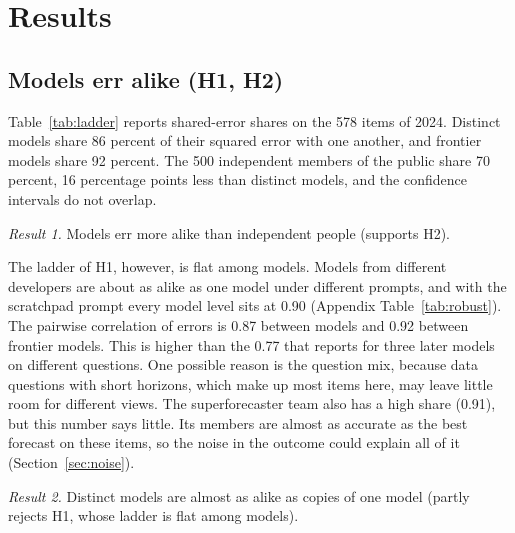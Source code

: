 \documentclass[11pt,a4paper]{article}
\theoremstyle{definition}
\begin{document}
\section{Results}\label{sec:results}

\subsection{Models err alike (H1, H2)}

Table~\ref{tab:ladder} reports shared-error shares on the 578 items of 2024. Distinct models share 86 percent of their squared error with one another, and frontier models share 92 percent. The 500 independent members of the public share 70 percent, 16 percentage points less than distinct models, and the confidence intervals do not overlap.

\emph{Result 1.} Models err more alike than independent people (supports H2).

The ladder of H1, however, is flat among models. Models from different developers are about as alike as one model under different prompts, and with the scratchpad prompt every model level sits at 0.90 (Appendix Table~\ref{tab:robust}). The pairwise correlation of errors is 0.87 between models and 0.92 between frontier models. This is higher than the 0.77 that \citet{spiro2026oracle} reports for three later models on different questions. One possible reason is the question mix, because data questions with short horizons, which make up most items here, may leave little room for different views. The superforecaster team also has a high share (0.91), but this number says little. Its members are almost as accurate as the best forecast on these items, so the noise in the outcome could explain all of it (Section~\ref{sec:noise}).

\emph{Result 2.} Distinct models are almost as alike as copies of one model (partly rejects H1, whose ladder is flat among models).
\end{document}
